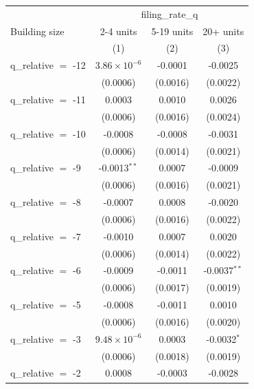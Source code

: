 
\begingroup
\centering
\begin{tabular}{lccc}
   \toprule
    & \multicolumn{3}{c}{filing\_rate\_q}\\
   Building size        & 2-4 units             & 5-19 units    & 20+ units \\   
                        & (1)                   & (2)           & (3)\\  
   \midrule 
   q\_relative $=$ -12  & $3.86\times 10^{-6}$  & -0.0001       & -0.0025\\   
                        & (0.0006)              & (0.0016)      & (0.0022)\\   
   q\_relative $=$ -11  & 0.0003                & 0.0010        & 0.0026\\   
                        & (0.0006)              & (0.0016)      & (0.0024)\\   
   q\_relative $=$ -10  & -0.0008               & -0.0008       & -0.0031\\   
                        & (0.0006)              & (0.0014)      & (0.0021)\\   
   q\_relative $=$ -9   & -0.0013$^{**}$        & 0.0007        & -0.0009\\   
                        & (0.0006)              & (0.0016)      & (0.0021)\\   
   q\_relative $=$ -8   & -0.0007               & 0.0008        & -0.0020\\   
                        & (0.0006)              & (0.0016)      & (0.0022)\\   
   q\_relative $=$ -7   & -0.0010               & 0.0007        & 0.0020\\   
                        & (0.0006)              & (0.0014)      & (0.0022)\\   
   q\_relative $=$ -6   & -0.0009               & -0.0011       & -0.0037$^{**}$\\   
                        & (0.0006)              & (0.0017)      & (0.0019)\\   
   q\_relative $=$ -5   & -0.0008               & -0.0011       & 0.0010\\   
                        & (0.0006)              & (0.0016)      & (0.0020)\\   
   q\_relative $=$ -3   & $9.48\times 10^{-6}$  & 0.0003        & -0.0032$^{*}$\\   
                        & (0.0006)              & (0.0018)      & (0.0019)\\   
   q\_relative $=$ -2   & 0.0008                & -0.0003       & -0.0028\\   

\end{tabular}
